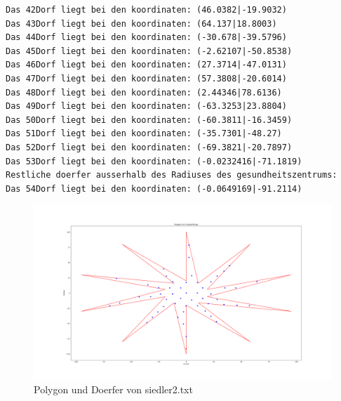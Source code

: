 \documentclass{article}
\begin{document}
\begin{verbatim}
Das 42Dorf liegt bei den koordinaten: (46.0382|-19.9032)
Das 43Dorf liegt bei den koordinaten: (64.137|18.8003)
Das 44Dorf liegt bei den koordinaten: (-30.678|-39.5796)
Das 45Dorf liegt bei den koordinaten: (-2.62107|-50.8538)
Das 46Dorf liegt bei den koordinaten: (27.3714|-47.0131)
Das 47Dorf liegt bei den koordinaten: (57.3808|-20.6014)
Das 48Dorf liegt bei den koordinaten: (2.44346|78.6136)
Das 49Dorf liegt bei den koordinaten: (-63.3253|23.8804)
Das 50Dorf liegt bei den koordinaten: (-60.3811|-16.3459)
Das 51Dorf liegt bei den koordinaten: (-35.7301|-48.27)
Das 52Dorf liegt bei den koordinaten: (-69.3821|-20.7897)
Das 53Dorf liegt bei den koordinaten: (-0.0232416|-71.1819)
Restliche doerfer ausserhalb des Radiuses des gesundheitszentrums: 
Das 54Dorf liegt bei den koordinaten: (-0.0649169|-91.2114)
\end{verbatim}
\newpage
\begin{figure}[h]
    \centering
    \includegraphics[width=1\textwidth]{Bilder/Figure_2.png}
    \caption{Polygon und Doerfer von siedler2.txt}
    \label{fig:example}
\end{figure}
\end{document}

